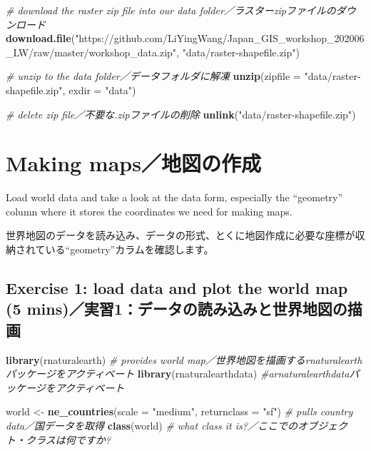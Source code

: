 \documentclass[
  xelatex,ja=standard]{bxjsarticle}
\newenvironment{Shaded}{\begin{snugshade}}{\end{snugshade}}
\newcommand{\CommentTok}[1]{\textcolor[rgb]{0.56,0.35,0.01}{\textit{#1}}}
\newcommand{\DataTypeTok}[1]{\textcolor[rgb]{0.13,0.29,0.53}{#1}}
\newcommand{\KeywordTok}[1]{\textcolor[rgb]{0.13,0.29,0.53}{\textbf{#1}}}
\newcommand{\NormalTok}[1]{#1}
\newcommand{\StringTok}[1]{\textcolor[rgb]{0.31,0.60,0.02}{#1}}
\begin{document}
\begin{Shaded}
\begin{Highlighting}[]
\CommentTok{# download the raster zip file into our data folder／ラスターzipファイルのダウンロード}
\KeywordTok{download.file}\NormalTok{(}\StringTok{"https://github.com/LiYingWang/Japan_GIS_workshop_202006_LW/raw/master/workshop_data.zip"}\NormalTok{, }\StringTok{"data/raster-shapefile.zip"}\NormalTok{)}

\CommentTok{# unzip to the data folder／データフォルダに解凍}
\KeywordTok{unzip}\NormalTok{(}\DataTypeTok{zipfile =} \StringTok{"data/raster-shapefile.zip"}\NormalTok{, }\DataTypeTok{exdir =} \StringTok{"data"}\NormalTok{)}

\CommentTok{# delete zip file／不要な.zipファイルの削除}
\KeywordTok{unlink}\NormalTok{(}\StringTok{"data/raster-shapefile.zip"}\NormalTok{)}
\end{Highlighting}
\end{Shaded}

\hypertarget{making-mapsux5730ux56f3ux306eux4f5cux6210}{%
\section{Making
maps／地図の作成}\label{making-mapsux5730ux56f3ux306eux4f5cux6210}}

Load world data and take a look at the data form, especially the
``geometry'' column where it stores the coordinates we need for making
maps.

世界地図のデータを読み込み、データの形式、とくに地図作成に必要な座標が収納されている``geometry''カラムを確認します。

\hypertarget{exercise-1-load-data-and-plot-the-world-map-5-minsux5b9fux7fd21ux30c7ux30fcux30bfux306eux8aadux307fux8fbcux307fux3068ux4e16ux754cux5730ux56f3ux306eux63cfux753b}{%
\subsection{Exercise 1: load data and plot the world map (5
mins)／実習1：データの読み込みと世界地図の描画}\label{exercise-1-load-data-and-plot-the-world-map-5-minsux5b9fux7fd21ux30c7ux30fcux30bfux306eux8aadux307fux8fbcux307fux3068ux4e16ux754cux5730ux56f3ux306eux63cfux753b}}

\begin{Shaded}
\begin{Highlighting}[]
\KeywordTok{library}\NormalTok{(rnaturalearth) }\CommentTok{# provides world map／世界地図を描画するrnaturalearthパッケージをアクティベート}
\KeywordTok{library}\NormalTok{(rnaturalearthdata) }\CommentTok{#arnaturalearthdataパッケージをアクティベート}

\NormalTok{world <-}\StringTok{ }\KeywordTok{ne_countries}\NormalTok{(}\DataTypeTok{scale =} \StringTok{"medium"}\NormalTok{, }\DataTypeTok{returnclass =} \StringTok{"sf"}\NormalTok{) }\CommentTok{# pulls country data／国データを取得}
\KeywordTok{class}\NormalTok{(world) }\CommentTok{# what class it is?／ここでのオブジェクト・クラスは何ですか?}
\end{Highlighting}
\end{Shaded}
\end{document}
